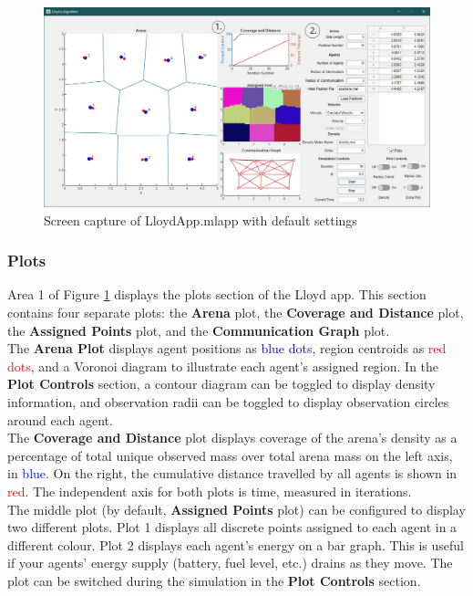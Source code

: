 \documentclass[../CourseManual.tex]{subfiles}
\begin{document}
\begin{figure}[H]
    \centering
    \includegraphics[width=350pt]{media/Lloyd.jpg}
    \caption{Screen capture of LloydApp.mlapp with default settings}
    \label{fig: lloyd app}
\end{figure}

\subsubsection{Plots} \label{Lloyd Plots}
Area 1 of Figure \ref{fig: lloyd app} displays the plots section of the Lloyd app. This section contains four separate plots: the \textbf{Arena} plot, the \textbf{Coverage and Distance} plot, the \textbf{Assigned Points} plot, and the \textbf{Communication Graph} plot. \\

The \textbf{Arena Plot} displays agent positions as \textcolor{blue}{blue dots}, region centroids as \textcolor{red}{red dots}, and a Voronoi diagram to illustrate each agent's assigned region. In the \textbf{Plot Controls} section, a contour diagram can be toggled to display density information, and observation radii can be toggled to display observation circles around each agent. \\

The \textbf{Coverage and Distance} plot displays coverage of the arena's density as a percentage of total unique observed mass over total arena mass on the left axis, in \textcolor{blue}{blue}. On the right, the cumulative distance travelled by all agents is shown in \textcolor{red}{red}. The independent axis for both plots is time, measured in iterations. \\

The middle plot (by default, \textbf{Assigned Points} plot) can be configured to display two different plots. Plot 1 displays all discrete points assigned to each agent in a different colour. Plot 2 displays each agent's energy on a bar graph. This is useful if your agents' energy supply (battery, fuel level, etc.) drains as they move. The plot can be switched during the simulation in the \textbf{Plot Controls} section. \\
\end{document}
